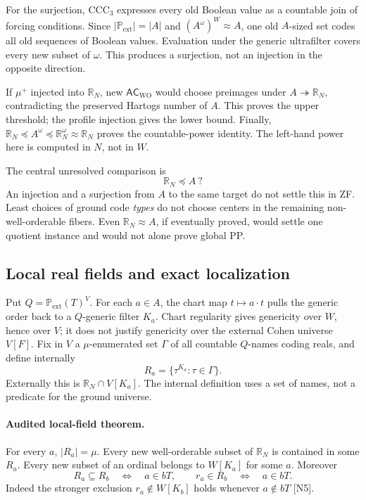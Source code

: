 For the surjection, $\mathrm{CCC}_3$ expresses every old Boolean value
as a countable join of forcing conditions.  Since
$|\mathbb P_{\mathrm{ext}}|=|A|$ and $(A^\omega)^W\approx A$, one old
$A$-sized set codes all old sequences of Boolean values.  Evaluation
under the generic ultrafilter covers every new subset of $\omega$.
This produces a surjection, not an injection in the opposite direction.

If $\mu^+$ injected into $\mathbb R_N$, new
$\mathsf{AC}_{\mathrm{WO}}$ would choose preimages under
$A\twoheadrightarrow\mathbb R_N$, contradicting the preserved Hartogs
number of $A$.  This proves the upper threshold; the profile injection
gives the lower bound.  Finally,
$\mathbb R_N\preccurlyeq A^\omega\preccurlyeq
\mathbb R_N^\omega\approx\mathbb R_N$ proves the countable-power
identity.  The left-hand power here is computed in $N$, not in $W$.

The central unresolved comparison is
\[
                         \mathbb R_N\preccurlyeq A\ ?
\]
An injection and a surjection from $A$ to the same target do not
settle this in ZF.  Least choices of ground code \emph{types} do not
choose centers in the remaining non-well-orderable fibers.  Even
$\mathbb R_N\approx A$, if eventually proved, would settle one
quotient instance and would not alone prove global PP.

\subsection{Local real fields and exact localization}

Put $Q=\mathbb P_{\mathrm{ext}}(T)^V$.  For each $a\in A$, the chart
map $t\mapsto a\cdot t$ pulls the generic order back to a $Q$-generic
filter $K_a$.  Chart regularity gives genericity over $W$, hence over
$V$; it does not justify genericity over the external Cohen universe
$V[F]$.  Fix in $V$ a $\mu$-enumerated set $\Gamma$ of all countable
$Q$-names coding reals, and define internally
\[
 R_a=\{\tau^{K_a}:\tau\in\Gamma\}.
\]
Externally this is $\mathbb R_N\cap V[K_a]$.  The internal definition
uses a set of names, not a predicate for the ground universe.

\paragraph{Audited local-field theorem.}
For every $a$, $|R_a|=\mu$.  Every new well-orderable subset of
$\mathbb R_N$ is contained in some $R_a$.  Every new subset of an
ordinal belongs to $W[K_a]$ for some $a$.  Moreover
\[
 R_a\subseteq R_b\quad\Longleftrightarrow\quad a\in bT,
 \qquad
 r_a\in R_b\quad\Longleftrightarrow\quad a\in bT.
\]
Indeed the stronger exclusion $r_a\notin W[K_b]$ holds whenever
$a\notin bT$ [N5].

